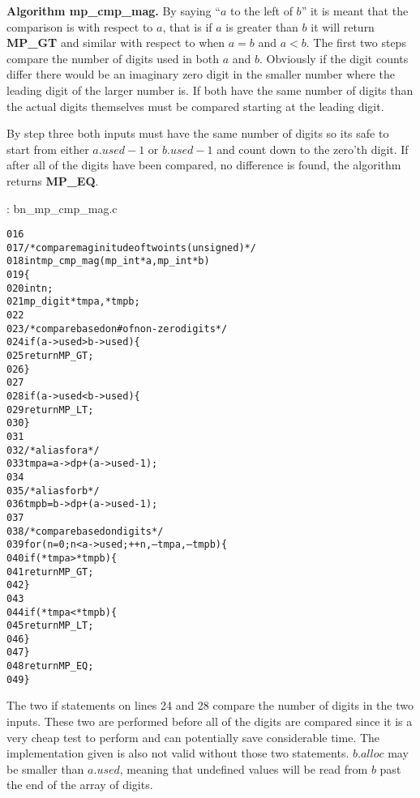 \documentclass[b5paper]{book}
\begin{document}
\textbf{Algorithm mp\_cmp\_mag.}
By saying ``$a$ to the left of $b$'' it is meant that the comparison is with respect to $a$, that is if $a$ is greater than $b$ it will return
\textbf{MP\_GT} and similar with respect to when $a = b$ and $a < b$.  The first two steps compare the number of digits used in both $a$ and $b$.  
Obviously if the digit counts differ there would be an imaginary zero digit in the smaller number where the leading digit of the larger number is.  
If both have the same number of digits than the actual digits themselves must be compared starting at the leading digit.  

By step three both inputs must have the same number of digits so its safe to start from either $a.used - 1$ or $b.used - 1$ and count down to
the zero'th digit.  If after all of the digits have been compared, no difference is found, the algorithm returns \textbf{MP\_EQ}.

\vspace{+3mm}\begin{small}
\hspace{-5.1mm}{\bf File}: bn\_mp\_cmp\_mag.c
\vspace{-3mm}
\begin{alltt}
016   
017   /* compare maginitude of two ints (unsigned) */
018   int mp_cmp_mag (mp_int * a, mp_int * b)
019   \{
020     int     n;
021     mp_digit *tmpa, *tmpb;
022   
023     /* compare based on # of non-zero digits */
024     if (a->used > b->used) \{
025       return MP_GT;
026     \}
027     
028     if (a->used < b->used) \{
029       return MP_LT;
030     \}
031   
032     /* alias for a */
033     tmpa = a->dp + (a->used - 1);
034   
035     /* alias for b */
036     tmpb = b->dp + (a->used - 1);
037   
038     /* compare based on digits  */
039     for (n = 0; n < a->used; ++n, --tmpa, --tmpb) \{
040       if (*tmpa > *tmpb) \{
041         return MP_GT;
042       \}
043   
044       if (*tmpa < *tmpb) \{
045         return MP_LT;
046       \}
047     \}
048     return MP_EQ;
049   \}
\end{alltt}
\end{small}

The two if statements on lines 24 and 28 compare the number of digits in the two inputs.  These two are performed before all of the digits
are compared since it is a very cheap test to perform and can potentially save considerable time.  The implementation given is also not valid 
without those two statements.  $b.alloc$ may be smaller than $a.used$, meaning that undefined values will be read from $b$ past the end of the 
array of digits.
\end{document}
